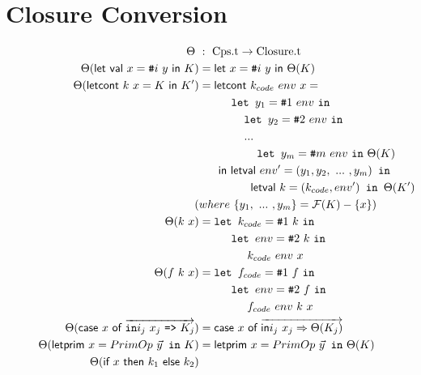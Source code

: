 \documentclass{article}
\theoremstyle{definition}
\theoremstyle{remark}
\numberwithin{equation}{section}
\begin{document}
\section{Closure Conversion}


\begin{figure}[!ht]
  \centering
\begin{align*}
\Theta\ &:\ \textrm{Cps.t} \to \textrm{Closure.t}\\     %
\Theta(\textsf{let val }x=\texttt{\#}i\ y\textsf{ in }K)
    &=\textsf{let }x=\texttt{\#}i\ y\textsf{ in }\Theta(K)\\   %
\Theta(\textsf{letcont }k\ x=K\textsf{ in }K')
    &=\textsf{letcont }k_{code}\ env\ x=\\
    &\kern1cm   \texttt{let }y_1=\texttt{\#}1\ env\ \texttt{in}\\
    &\kern1.4cm   \texttt{let }y_2=\texttt{\#}2\ env\ \texttt{in}\\
    &\kern1.4cm   ...\\
    &\kern1.8cm   \texttt{let }y_m=\texttt{\#}m\ env\ \texttt{in}\ \Theta(K)\\
    &\kern0.6cm\textsf{in letval }env'=(y_1, y_2, \ ...\ ,y_m)\texttt{ in}\\
    &\kern1.6cm\textsf{letval }k=(k_{code}, env')\texttt{ in }\Theta(K')\\ %
    (&where\ \{y_1,\ ...\ ,y_m\}=\mathcal{F}(K)-\{x\})\\
\Theta(k\ x)
    &=\texttt{let }k_{code}=\texttt{\#}1\ k\ \texttt{in}\\
    &\kern1cm   \texttt{let }env=\texttt{\#}2\ k\ \texttt{in}\\
    &\kern1.5cm  k_{code}\ env\ x\\   %
\Theta(f\ k\ x)
    &=\texttt{let }f_{code}=\texttt{\#}1\ f\ \texttt{in}\\
    &\kern1cm   \texttt{let }env=\texttt{\#}2\ f\ \texttt{in}\\
    &\kern1.5cm  f_{code}\ env\ k \ x\\   %
\Theta(\textsf{case}\ x\ \textsf{of}
           \ \overrightarrow{\texttt{in}i_j\ x_j\ \texttt{=>}\ K_j})
    &=\textsf{case }x\ \textsf{of}\ \overrightarrow{\textsf{in}i_j\ x_j \Rightarrow
     \Theta(K_j)}\\   %
\Theta(\textsf{letprim }x=PrimOp\ \vec{y}\texttt{ in}\ K)
    &=\textsf{letprim }x=PrimOp\ \vec{y}\texttt{ in}\ \Theta(K)\\   %
\Theta(\textsf{if }x\textsf{ then }k_1\ \textsf{else }k_2)

\end{align*}
\end{figure}
\end{document}
